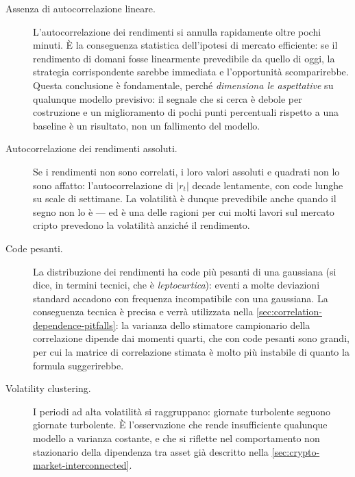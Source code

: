 \begin{description}
    \item[Assenza di autocorrelazione lineare.] L'autocorrelazione dei rendimenti si annulla rapidamente oltre pochi minuti. È la conseguenza statistica dell'ipotesi di mercato efficiente: se il rendimento di domani fosse linearmente prevedibile da quello di oggi, la strategia corrispondente sarebbe immediata e l'opportunità scomparirebbe. Questa conclusione è fondamentale, perché \emph{dimensiona le aspettative} su qualunque modello previsivo: il segnale che si cerca è debole per costruzione e un miglioramento di pochi punti percentuali rispetto a una baseline è un risultato, non un fallimento del modello.
    \item[Autocorrelazione dei rendimenti assoluti.] Se i rendimenti non sono correlati, i loro valori assoluti e quadrati non lo sono affatto: l'autocorrelazione di $|r_t|$ decade lentamente, con code lunghe su scale di settimane. La volatilità è dunque prevedibile anche quando il segno non lo è — ed è una delle ragioni per cui molti lavori sul mercato cripto prevedono la volatilità anziché il rendimento.
    \item[Code pesanti.] La distribuzione dei rendimenti ha code più pesanti di una gaussiana (si dice, in termini tecnici, che è \emph{leptocurtica}): eventi a molte deviazioni standard accadono con frequenza incompatibile con una gaussiana. La conseguenza tecnica è precisa e verrà utilizzata nella \cref{sec:correlation-dependence-pitfalls}: la varianza dello stimatore campionario della correlazione dipende dai momenti quarti, che con code pesanti sono grandi, per cui la matrice di correlazione stimata è molto più instabile di quanto la formula suggerirebbe.
    \item[Volatility clustering.] I periodi ad alta volatilità si raggruppano: giornate turbolente seguono giornate turbolente. È l'osservazione che rende insufficiente qualunque modello a varianza costante, e che si riflette nel comportamento non stazionario della dipendenza tra asset già descritto nella \cref{sec:crypto-market-interconnected}.
\end{description}

